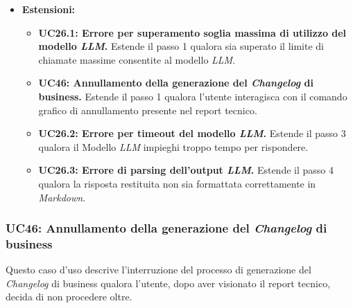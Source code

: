 \documentclass[12pt, a4paper]{article}
\begin{document}
\begin{itemize}
    \item \textbf{Estensioni:}
    \begin{itemize}
        \item \textbf{UC26.1: Errore per superamento soglia massima di utilizzo del modello \textit{LLM}.} Estende il passo 1 qualora sia superato il limite di chiamate massime consentite al modello \textit{LLM}.
        \item \textbf{UC46: Annullamento della generazione del \textit{Changelog} di business.} Estende il passo 1 qualora l'utente interagisca con il comando grafico di annullamento presente nel report tecnico.
        \item \textbf{UC26.2: Errore per timeout del modello \textit{LLM}.} Estende il passo 3 qualora il Modello \textit{LLM} impieghi troppo tempo per rispondere.
        \item \textbf{UC26.3: Errore di parsing dell'output \textit{LLM}.} Estende il passo 4 qualora la risposta restituita non sia formattata correttamente in \textit{Markdown}.
    \end{itemize}
\end{itemize}

\subsubsection{UC46: Annullamento della generazione del \textit{Changelog} di business}\label{uc:46}
Questo caso d'uso descrive l'interruzione del processo di generazione del \textit{Changelog} di business qualora l'utente, dopo aver visionato il report tecnico, decida di non procedere oltre.
\end{document}
